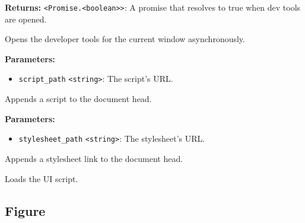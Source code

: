 \documentclass[12pt,a4paper]{article}
\begin{document}
\vspace{5mm}
\noindent {}


\noindent \textbf{Returns:} \texttt{<Promise.<boolean>>}: A promise that resolves to true when dev tools are opened.

\noindent Opens the developer tools for the current window asynchronously.

\vspace{5mm}
\noindent {}


\noindent \textbf{Parameters:}
\begin{itemize}
  \item \texttt{script\_path} \texttt{<string>}: The script's URL.
\end{itemize}

\noindent Appends a script to the document head.

\vspace{5mm}
\noindent {}


\noindent \textbf{Parameters:}
\begin{itemize}
  \item \texttt{stylesheet\_path} \texttt{<string>}: The stylesheet's URL.
\end{itemize}

\noindent Appends a stylesheet link to the document head.

\vspace{5mm}
\noindent {}


\noindent Loads the UI script.


\subsection{Figure}
\vspace{5mm}
\noindent {}
\end{document}
